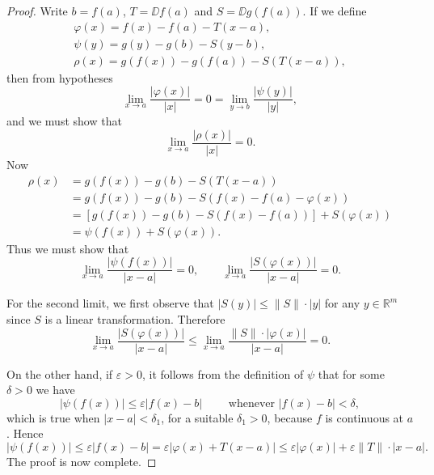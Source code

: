 \documentclass[11pt]{article}
\begin{document}
\begin{proof} 
  Write $b = f(a)$, $T = \DD f(a)$ and $S = \DD g(f(a))$.  If we define
\begin{gather*}
  \varphi(x) = f(x) - f(a) - T(x-a), \\
  \psi(y) = g(y) - g(b) - S(y-b), \\
  \rho(x) = g(f(x)) - g(f(a)) - S(T(x-a)),
\end{gather*}
then from hypotheses
\begin{equation*}
  \lim_{x \rightarrow a} \frac{ |\varphi(x)| }{|x|} = 0 =
  \lim_{y \rightarrow b} \frac{ |\psi(y)| }{|y|},
\end{equation*}
and we must show that
\begin{equation*}
  \lim_{x \rightarrow a} \frac{ |\rho(x)| }{ |x| } = 0.
\end{equation*}
Now
\begin{align*}
    \rho(x) &= g(f(x)) - g(b) - S(T(x-a)) \\
    &= g(f(x)) - g(b) - S(f(x) - f(a) - \varphi(x)) \\
    &= [g(f(x)) - g(b) - S(f(x) - f(a))] + S(\varphi(x)) \\
    &= \psi(f(x)) + S(\varphi(x)).
\end{align*}
Thus we must show that
\begin{equation*}
  \lim_{x \rightarrow a} \frac{ |\psi(f(x))| }{|x - a|} = 0, \qquad
  \lim_{x \rightarrow a} \frac{ |S(\varphi(x))| }{|x - a|} = 0.
\end{equation*}

For the second limit, we first observe that $|S(y)| \leqslant \|S\| \cdot |y|$ for any $y \in \mathbb{R}^m$ since $S$ is a linear transformation.  Therefore
\begin{equation*}
  \lim_{x \rightarrow a} \frac{ |S(\varphi(x))| }{|x - a|} \leqslant 
  \lim_{x \rightarrow a} \frac{ \|S\| \cdot |\varphi(x)| }{|x - a|}
  = 0.
\end{equation*}

On the other hand, if $\varepsilon > 0$, it follows from the
definition of $\psi$ that for some $\delta > 0$ we have
\begin{equation*}
  | \psi(f(x)) | \leqslant \varepsilon | f(x) - b | \qquad \text{ whenever } |f(x) - b | < \delta,
\end{equation*}
which is true when $|x - a| < \delta_1$, for a suitable $\delta_1 > 0$,
because $f$ is continuous at $a$.  Hence
\begin{equation*}
  | \psi(f(x)) | \leqslant \varepsilon |f(x) - b| = \varepsilon | \varphi(x) +
    T(x - a)| \leqslant \varepsilon |\varphi(x)| + \varepsilon \|T\| \cdot |x
    - a|.
\end{equation*}
The proof is now complete.
\end{proof}
\end{document}
